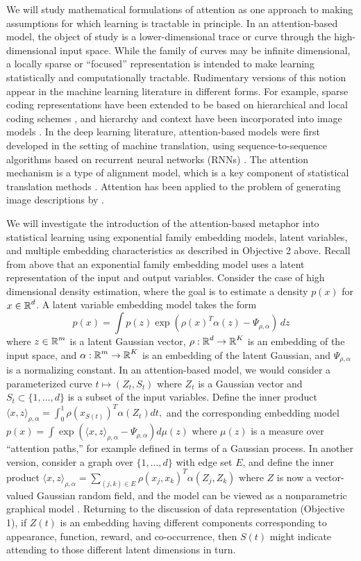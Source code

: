 We will study mathematical formulations of attention as one approach
to making assumptions for which learning is tractable in principle.
In an attention-based model, the object of study is a
lower-dimensional trace or curve through the high-dimensional input
space. While the family of curves may be infinite dimensional, a
locally sparse or ``focused'' representation is intended to make
learning statistically and computationally tractable. Rudimentary
versions of this notion appear in the machine learning literature in
different forms.  For example, sparse coding representations have
been extended to be based on hierarchical and local coding schemes
\citep{WangYYLHG10,YuLL11}, and hierarchy and context have been 
incorporated into image models \citep{ChangJZBG11,JinG06}. In the
deep learning literature, attention-based models were first developed
in the setting of machine translation, using sequence-to-sequence
algorithms based on recurrent neural networks
(RNNs) \citep{bahdanau2014}. The attention mechanism is a type of
alignment model, which is a key component of statistical translation
methods \citep{Brown1993}. Attention has been applied to the problem of generating image
descriptions by \cite{showtell}.

We will investigate the introduction of the attention-based metaphor into
statistical learning using exponential family embedding models, latent
variables, and multiple embedding characteristics as described in
Objective 2 above. 
Recall from above that an exponential family embedding model uses a
latent representation of the input and output variables. Consider the
case of high dimensional density estimation, where the goal is to
estimate a density $p(x)$ for $x\in\mbox{$\mathbb{R}$}^d$.  A latent variable
embedding model takes the form
$$ p(x) = \int p(z) \exp(\rho(x)^T \alpha(z) - \Psi_{\rho,\alpha}) \, dz$$
where $z\in \mbox{$\mathbb{R}$}^m$ is a latent Gaussian vector,
$\rho:\mbox{$\mathbb{R}$}^d \to \mbox{$\mathbb{R}$}^K$ is an embedding of the input space,
and $\alpha: \mbox{$\mathbb{R}$}^m \to\mbox{$\mathbb{R}$}^K$ is an embedding of the latent
Gaussian, and $\Psi_{\rho,\alpha}$ is a normalizing constant.
In an attention-based model, we would consider a parameterized curve $t\mapsto (Z_t, S_t)$
where $Z_t$ is a Gaussian vector and $S_t \subset \{1,\ldots, d\}$
is a subset of the input variables. Define the inner product 
$\langle x, z\rangle_{\rho,\alpha}
= \int_{0}^1 \rho\left(x_{S(t)}\right)^T \alpha(Z_t) dt,$
and the corresponding embedding model
$ p(x) = \int \exp\left(\langle x, z\rangle_{\rho,\alpha} - \Psi_{\rho,\alpha}\right) d\mu(z)$ where $\mu(z)$ is a 
measure over ``attention paths,'' for example defined in terms of a Gaussian process.
In another version, consider a graph over $\{1,\ldots, d\}$ with edge
set $E$, and define the inner product
$\langle x, z\rangle_{\rho,\alpha}
= \sum_{(j,k)\in E} \rho(x_j, x_k)^T \alpha(Z_j, Z_k)$
where $Z$ is now a vector-valued Gaussian random field, 
and the model can be viewed as a nonparametric graphical model
\citep{hl18}. Returning to the discussion of data representation (Objective 1), 
if $Z(t)$ is an embedding having different components corresponding
to appearance, function, reward, and co-occurrence, then $S(t)$ might 
indicate attending to those different latent dimensions in turn.

